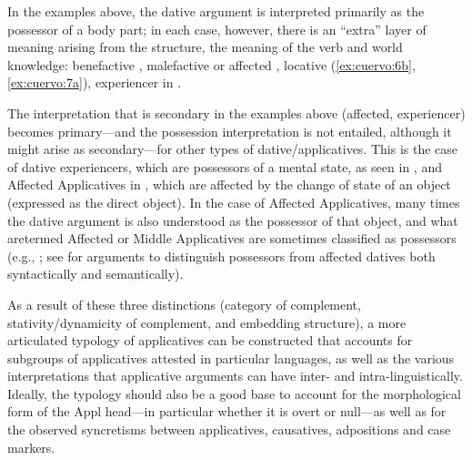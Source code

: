 \documentclass[output=paper,colorlinks,citecolor=brown,nonflat]{./langscibook}
\begin{document}
In the examples above, the dative argument is interpreted primarily as the possessor of a body part; in each case, however, there is an “extra” layer of meaning arising from the structure, the meaning of the verb and world knowledge: benefactive , malefactive or affected , locative (\ref{ex:cuervo:6b}, \ref{ex:cuervo:7a}), experiencer in . 

The interpretation that is secondary in the examples above (affected, experiencer) becomes primary—and the possession interpretation is not entailed, although it might arise as secondary—for other types of dative/applicatives. This is the case of dative experiencers, which are possessors of a mental state, as seen in , and Affected Applicatives in , which are affected by the change of state of an object (expressed as the direct object). In the case of Affected Applicatives, many times the dative argument is also understood as the possessor of that object, and what aretermed Affected or Middle Applicatives are sometimes classified as possessors (e.g., \citealt{FernándezAlcalde2014}; see \citealt{Cuervo2003} for arguments to distinguish possessors from affected datives both syntactically and semantically). 

As a result of these three distinctions (category of complement, stativity/dynamicity of complement, and embedding structure), a more articulated typology of applicatives can be constructed that accounts for subgroups of applicatives attested in particular languages, as well as the various interpretations that applicative arguments can have inter- and intra-linguistically. Ideally, the typology should also be a good base to account for the morphological form of the Appl head—in particular whether it is overt or null—as well as for the observed syncretisms between applicatives, causatives, adpositions and case markers.
\end{document}
